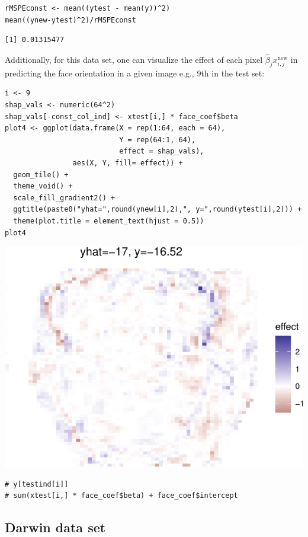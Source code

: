 \documentclass[
  article]{jss}
\begin{document}
\begin{verbatim}
rMSPEconst <- mean((ytest - mean(y))^2) 
mean((ynew-ytest)^2)/rMSPEconst
\end{verbatim}

\begin{verbatim}
[1] 0.01315477
\end{verbatim}

Additionally, for this data set, one can visualize the effect of each
pixel \(\hat\beta_j x^\text{new}_{i,j}\) in predicting the face
orientation in a given image e.g., 9th in the test set:

\begin{verbatim}
i <- 9
shap_vals <- numeric(64^2)
shap_vals[-const_col_ind] <- xtest[i,] * face_coef$beta
plot4 <- ggplot(data.frame(X = rep(1:64, each = 64),
                           Y = rep(64:1, 64),
                           effect = shap_vals), 
                aes(X, Y, fill= effect)) +
  geom_tile() +
  theme_void() +
  scale_fill_gradient2() +
  ggtitle(paste0("yhat=",round(ynew[i],2),", y=",round(ytest[i],2))) +
  theme(plot.title = element_text(hjust = 0.5)) 
plot4
\end{verbatim}

\includegraphics{SPAR_files/figure-pdf/unnamed-chunk-12-1.pdf}

\begin{verbatim}
# y[testind[i]]
# sum(xtest[i,] * face_coef$beta) + face_coef$intercept
\end{verbatim}

\subsection{Darwin data set}\label{darwin-data-set}
\end{document}
